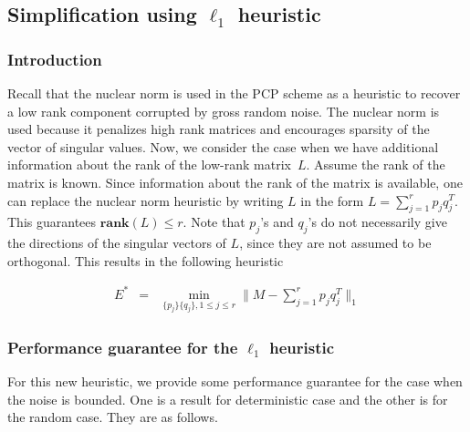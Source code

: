 \subsection{Simplification using $\ell_{1}$ heuristic}


\subsubsection{Introduction}

Recall that the nuclear norm is used in the PCP scheme as a heuristic to recover a low rank component corrupted by gross random noise. The nuclear norm is used because it penalizes high rank matrices and encourages sparsity of the vector of singular values. Now, we consider the case when we have additional information about the rank of the low-rank matrix~$L$. Assume the rank of the matrix is known. Since information about the rank of the matrix is available, one can replace the nuclear norm heuristic by writing $L$ in the form $L = \sum_{j = 1}^r p_j q_j^T$. This guarantees $\mathbf{rank}(L) \leq r$. Note that $p_j$'s and $q_j$'s do not necessarily give the directions of the singular vectors of $L$, since they are not assumed to be orthogonal. This results in the following heuristic

\begin{eqnarray}
E^{*} & = & \min_{\{p_{j}\}\{q_{j}\},1\le j\le r}\|M-\sum_{j=1}^{r}p_{j}q_{j}^{T}\|_{1}\label{heu}
\end{eqnarray}



\subsubsection{Performance guarantee for the $\ell_1$ heuristic}

For this new heuristic, we provide some performance guarantee for the case when the noise is bounded. One is a result for deterministic case
and the other is for the random case. They are as follows.

